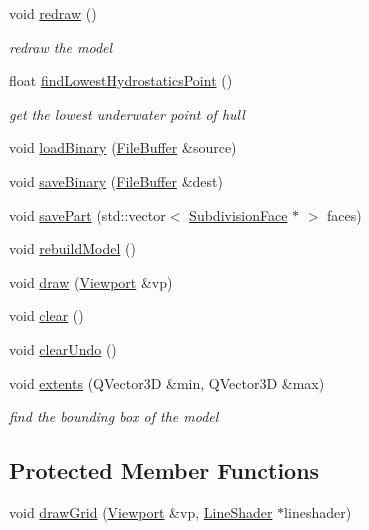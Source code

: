 \begin{DoxyCompactItemize}
void \hyperlink{classShipCAD_1_1ShipCADModel_af06c21c121f42e1ac4e5510d8c9ed3cd}{redraw} ()
\begin{DoxyCompactList}\small\item\em redraw the model \end{DoxyCompactList}\item 
float \hyperlink{classShipCAD_1_1ShipCADModel_a8cde3b7ca816132af3c722cd31af3107}{find\-Lowest\-Hydrostatics\-Point} ()
\begin{DoxyCompactList}\small\item\em get the lowest underwater point of hull \end{DoxyCompactList}\item 
void \hyperlink{classShipCAD_1_1ShipCADModel_ad3e49bc04c73dc221e48d15974b68f41}{load\-Binary} (\hyperlink{classShipCAD_1_1FileBuffer}{File\-Buffer} \&source)
\item 
void \hyperlink{classShipCAD_1_1ShipCADModel_a64c7c4ddffffdd1be2f27eb4210af2b7}{save\-Binary} (\hyperlink{classShipCAD_1_1FileBuffer}{File\-Buffer} \&dest)
\item 
void \hyperlink{classShipCAD_1_1ShipCADModel_a0d8f9cb2ce8038f6e65d90e8cab275e7}{save\-Part} (std\-::vector$<$ \hyperlink{classShipCAD_1_1SubdivisionFace}{Subdivision\-Face} $\ast$ $>$ faces)
\item 
void \hyperlink{classShipCAD_1_1ShipCADModel_a2e03bcc700adfcf768e257c91f5b0df9}{rebuild\-Model} ()
\item 
void \hyperlink{classShipCAD_1_1ShipCADModel_abf593b803e96a1fd8e56f36b3b6d0954}{draw} (\hyperlink{classShipCAD_1_1Viewport}{Viewport} \&vp)
\item 
void \hyperlink{classShipCAD_1_1ShipCADModel_ad2f9dfd32667e9ac690de184b7e576f1}{clear} ()
\item 
void \hyperlink{classShipCAD_1_1ShipCADModel_a9d693b6b2180ce94e88224df49b909a2}{clear\-Undo} ()
\item 
void \hyperlink{classShipCAD_1_1ShipCADModel_a7ab84a738b747c4fcb2c3627e56d4bd0}{extents} (Q\-Vector3\-D \&min, Q\-Vector3\-D \&max)
\begin{DoxyCompactList}\small\item\em find the bounding box of the model \end{DoxyCompactList}\end{DoxyCompactItemize}
\subsection*{Protected Member Functions}
\begin{DoxyCompactItemize}
\item 
void \hyperlink{classShipCAD_1_1ShipCADModel_a04d6e146dff42232658531c64d064217}{draw\-Grid} (\hyperlink{classShipCAD_1_1Viewport}{Viewport} \&vp, \hyperlink{classShipCAD_1_1LineShader}{Line\-Shader} $\ast$lineshader)
\end{DoxyCompactItemize}


